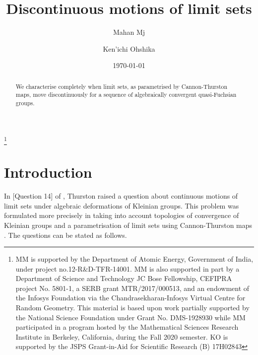 \documentclass{amsart}
\theoremstyle{definition}
\begin{document}
	\title{Discontinuous motions of limit sets}
	\author{Mahan Mj}
	\address{School
		of Mathematics, Tata Institute of Fundamental Research\\ 1, Homi Bhabha Road, Mumbai-400005, India}
	
	
	\author{Ken'ichi Ohshika}
		\address{Department of Mathematics, Gakushuin University, Mejiro, Toshima-ku, Tokyo, Japan}
	
	\date{\today}
	
	\thanks{MM is   supported by  the Department of Atomic Energy, Government of India, under project no.12-R\&D-TFR-14001.
		MM is also supported in part by a Department of Science and Technology JC Bose Fellowship, CEFIPRA  project No. 5801-1, a SERB grant MTR/2017/000513, and an endowment of the Infosys Foundation via the Chandrasekharan-Infosys Virtual Centre for Random Geometry.   This material is based upon work partially supported by the National Science Foundation
		under Grant No. DMS-1928930 while MM participated in a program hosted
		by the Mathematical Sciences Research Institute in Berkeley, California, during the
		Fall 2020 semester.
		KO is supported by the JSPS Grant-in-Aid for Scientific Research (B)  17H02843}
	
	\begin{abstract}
		We characterise completely when limit sets, as parametrised by Cannon-Thurston maps, move discontinuously for a sequence of algebraically  convergent quasi-Fuchsian groups.
	\end{abstract}
	
	
	
	
	
	
	
	
	
	
	
	
	\maketitle
	
	
	\tableofcontents

\sloppy
\section{Introduction}
In [Question 14] of  \cite{thurston-bams}, Thurston raised a question about continuous motions of limit sets under algebraic deformations of Kleinian groups. This problem was formulated more precisely in \cite{mahan-series1, mahan-series2} taking into account topologies of convergence of Kleinian groups and a parametrisation of limit sets using  Cannon-Thurston maps \cite{CT, mahan-split}.
The questions can be stated as follows.
\end{document}
